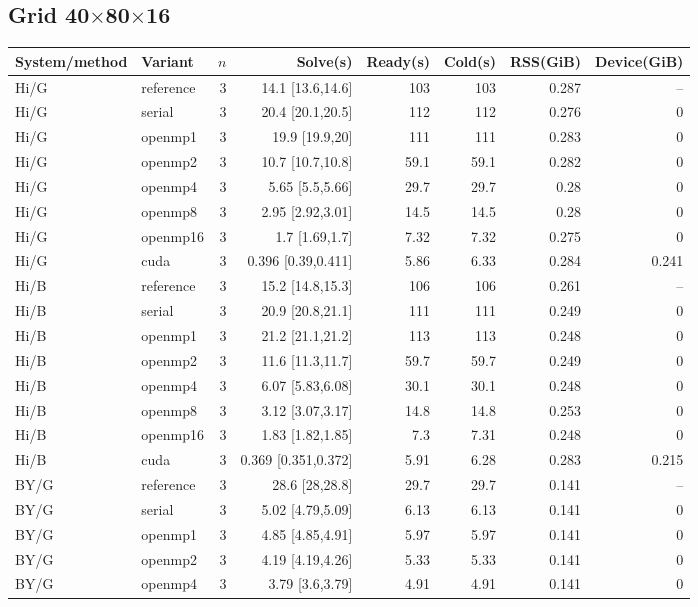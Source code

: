 \documentclass[11pt]{article}
\begin{document}
\subsection{Grid 40$\times$80$\times$16}
\footnotesize
\begin{longtable}{llrrrrrr}
\toprule System/method & Variant & $n$ & Solve(s) & Ready(s) & Cold(s) & RSS(GiB) & Device(GiB)\\
\midrule\endhead
Hi/G & reference & 3 & 14.1 [13.6,14.6] & 103 & 103 & 0.287 & --\\
Hi/G & serial & 3 & 20.4 [20.1,20.5] & 112 & 112 & 0.276 & 0\\
Hi/G & openmp1 & 3 & 19.9 [19.9,20] & 111 & 111 & 0.283 & 0\\
Hi/G & openmp2 & 3 & 10.7 [10.7,10.8] & 59.1 & 59.1 & 0.282 & 0\\
Hi/G & openmp4 & 3 & 5.65 [5.5,5.66] & 29.7 & 29.7 & 0.28 & 0\\
Hi/G & openmp8 & 3 & 2.95 [2.92,3.01] & 14.5 & 14.5 & 0.28 & 0\\
Hi/G & openmp16 & 3 & 1.7 [1.69,1.7] & 7.32 & 7.32 & 0.275 & 0\\
Hi/G & cuda & 3 & 0.396 [0.39,0.411] & 5.86 & 6.33 & 0.284 & 0.241\\
Hi/B & reference & 3 & 15.2 [14.8,15.3] & 106 & 106 & 0.261 & --\\
Hi/B & serial & 3 & 20.9 [20.8,21.1] & 111 & 111 & 0.249 & 0\\
Hi/B & openmp1 & 3 & 21.2 [21.1,21.2] & 113 & 113 & 0.248 & 0\\
Hi/B & openmp2 & 3 & 11.6 [11.3,11.7] & 59.7 & 59.7 & 0.249 & 0\\
Hi/B & openmp4 & 3 & 6.07 [5.83,6.08] & 30.1 & 30.1 & 0.248 & 0\\
Hi/B & openmp8 & 3 & 3.12 [3.07,3.17] & 14.8 & 14.8 & 0.253 & 0\\
Hi/B & openmp16 & 3 & 1.83 [1.82,1.85] & 7.3 & 7.31 & 0.248 & 0\\
Hi/B & cuda & 3 & 0.369 [0.351,0.372] & 5.91 & 6.28 & 0.283 & 0.215\\
BY/G & reference & 3 & 28.6 [28,28.8] & 29.7 & 29.7 & 0.141 & --\\
BY/G & serial & 3 & 5.02 [4.79,5.09] & 6.13 & 6.13 & 0.141 & 0\\
BY/G & openmp1 & 3 & 4.85 [4.85,4.91] & 5.97 & 5.97 & 0.141 & 0\\
BY/G & openmp2 & 3 & 4.19 [4.19,4.26] & 5.33 & 5.33 & 0.141 & 0\\
BY/G & openmp4 & 3 & 3.79 [3.6,3.79] & 4.91 & 4.91 & 0.141 & 0\\

\end{longtable}
\end{document}
